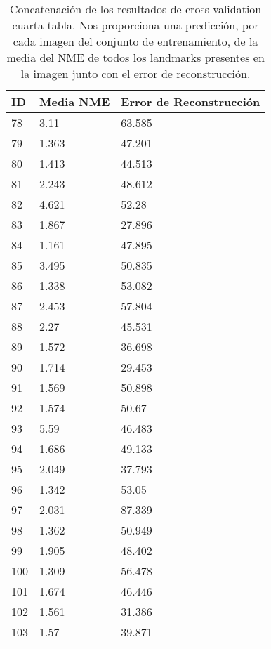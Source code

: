 \begin{table}[!ht]
    \centering
    \caption{Concatenación de los resultados de cross-validation cuarta tabla. Nos proporciona una predicción, por cada imagen del conjunto de entrenamiento, de la media del NME de todos los landmarks presentes en la imagen junto con el error de reconstrucción.}
    \begin{tabular}{|l|l|l|}
    \hline
        \cellcolor{gray!25}\textbf{ID} & \cellcolor{gray!25}\textbf{Media NME} & \cellcolor{gray!25}\textbf{Error de Reconstrucción} \\ \hline
        78 & 3.11 & 63.585 \\ \hline
        79 & 1.363 & 47.201 \\ \hline
        80 & 1.413 & 44.513 \\ \hline
        81 & 2.243 & 48.612 \\ \hline
        82 & 4.621 & 52.28 \\ \hline
        83 & 1.867 & 27.896 \\ \hline
        84 & 1.161 & 47.895 \\ \hline
        85 & 3.495 & 50.835 \\ \hline
        86 & 1.338 & 53.082 \\ \hline
        87 & 2.453 & 57.804 \\ \hline
        88 & 2.27 & 45.531 \\ \hline
        89 & 1.572 & 36.698 \\ \hline
        90 & 1.714 & 29.453 \\ \hline
        91 & 1.569 & 50.898 \\ \hline
        92 & 1.574 & 50.67 \\ \hline
        93 & 5.59 & 46.483 \\ \hline
        94 & 1.686 & 49.133 \\ \hline
        95 & 2.049 & 37.793 \\ \hline
        96 & 1.342 & 53.05 \\ \hline
        97 & 2.031 & 87.339 \\ \hline
        98 & 1.362 & 50.949 \\ \hline
        99 & 1.905 & 48.402 \\ \hline
        100 & 1.309 & 56.478 \\ \hline
        101 & 1.674 & 46.446 \\ \hline
        102 & 1.561 & 31.386 \\ \hline
        103 & 1.57 & 39.871 \\ \hline
    \end{tabular}
    \label{table:ModelBase_landmarkresume}
\end{table}

